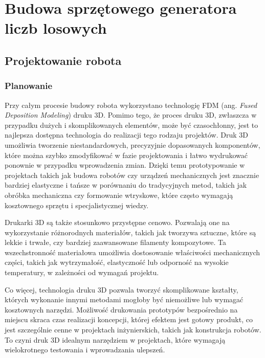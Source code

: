 
\chapter{Budowa sprzętowego generatora liczb losowych}\label{ch:budowa-sprzetowego-generatora}


\section{Projektowanie robota}\label{sec:projektowanie-robota}

\subsection{Planowanie}\label{subsec:Planowanie}

Przy całym procesie budowy robota wykorzystano technologię FDM (ang. \textit{Fused Deposition Modeling}) druku 3D. Pomimo tego, że proces druku 3D, zwłaszcza w przypadku dużych i skomplikowanych elementów, może być czasochłonny, jest to najlepsza dostępna
technologia do realizacji tego rodzaju projektów. Druk 3D umożliwia tworzenie niestandardowych, precyzyjnie dopasowanych komponentów, które można 
szybko zmodyfikować w fazie projektowania i łatwo wydrukować ponownie w przypadku wprowadzenia zmian. Dzięki temu prototypowanie w projektach takich 
jak budowa robotów czy urządzeń mechanicznych jest znacznie bardziej elastyczne i tańsze w porównaniu do tradycyjnych metod, takich jak obróbka 
mechaniczna czy formowanie wtryskowe, które często wymagają kosztownego sprzętu i specjalistycznej wiedzy.

Drukarki 3D są także stosunkowo przystępne cenowo. Pozwalają one na wykorzystanie różnorodnych materiałów, takich jak tworzywa sztuczne, które są lekkie 
i trwałe, czy bardziej zaawansowane filamenty kompozytowe. Ta wszechstronność materiałowa umożliwia dostosowanie właściwości mechanicznych części, takich 
jak wytrzymałość, elastyczność lub odporność na wysokie temperatury, w zależności od wymagań projektu.

Co więcej, technologia druku 3D pozwala tworzyć skomplikowane kształty, których wykonanie innymi metodami mogłoby być niemożliwe lub wymagać kosztownych 
narzędzi. Możliwość drukowania prototypów bezpośrednio na miejscu skraca czas realizacji koncepcji, której efektem jest gotowy produkt, co jest szczególnie cenne w 
projektach inżynierskich, takich jak konstrukcja robotów. To czyni druk 3D idealnym narzędziem w projektach, które wymagają wielokrotnego 
testowania i wprowadzania ulepszeń.

